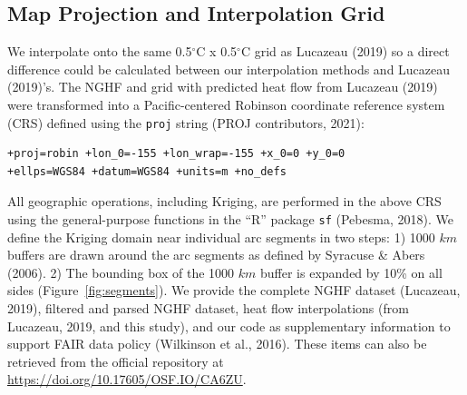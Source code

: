 \documentclass[draft,linenumbers]{agujournal2018}
\begin{document}
\subsection{Map Projection and Interpolation Grid}

We interpolate onto the same 0.5\(^{\circ}\)C x 0.5\(^{\circ}\)C grid as
Lucazeau (2019) so a direct difference could be calculated between our
interpolation methods and Lucazeau (2019)'s. The NGHF and grid with
predicted heat flow from Lucazeau (2019) were transformed into a
Pacific-centered Robinson coordinate reference system (CRS) defined
using the \texttt{proj} string (PROJ contributors, 2021):

\begin{verbatim}
+proj=robin +lon_0=-155 +lon_wrap=-155 +x_0=0 +y_0=0
+ellps=WGS84 +datum=WGS84 +units=m +no_defs
\end{verbatim}

All geographic operations, including Kriging, are performed in the above
CRS using the general-purpose functions in the ``R'' package \texttt{sf}
(Pebesma, 2018). We define the Kriging domain near individual arc
segments in two steps: 1) 1000 \(km\) buffers are drawn around the arc
segments as defined by Syracuse \& Abers (2006). 2) The bounding box of
the 1000 \(km\) buffer is expanded by 10\% on all sides
(Figure~\ref{fig:segments}). We provide the complete NGHF dataset
(Lucazeau, 2019), filtered and parsed NGHF dataset, heat flow
interpolations (from Lucazeau, 2019, and this study), and our code as
supplementary information to support FAIR data policy (Wilkinson et al.,
2016). These items can also be retrieved from the official repository at
\url{https://doi.org/10.17605/OSF.IO/CA6ZU}.
\end{document}
